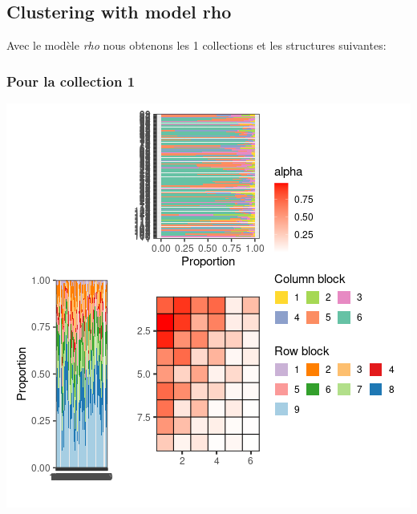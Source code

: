 \hypertarget{clustering-with-model-rho}{%
\subsection{Clustering with model rho}\label{clustering-with-model-rho}}

Avec le modèle \emph{rho} nous obtenons les 1 collections et les
structures suivantes:

\subsubsection{Pour la collection 1 }

\includegraphics{./img/ddafd83b5651fceb6261e4b7a7637e13859cac33.png}\newline \tiny

